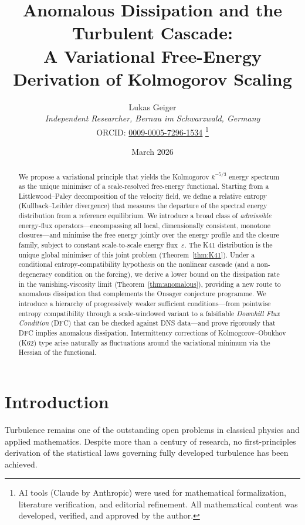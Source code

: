 \documentclass[12pt,a4paper]{article}
\title{Anomalous Dissipation and the Turbulent Cascade:\\
A Variational Free-Energy Derivation of Kolmogorov Scaling}
\author{Lukas Geiger\\
\textit{Independent Researcher, Bernau im Schwarzwald, Germany}\\
ORCID: \href{https://orcid.org/0009-0005-7296-1534}{0009-0005-7296-1534}%
\thanks{AI tools (Claude by Anthropic) were used for mathematical formalization, literature verification, and editorial refinement. All mathematical content was developed, verified, and approved by the author.}}
\date{March 2026}
\theoremstyle{definition}
\theoremstyle{plain}
\theoremstyle{remark}
\begin{document}
\maketitle

\begin{abstract}
We propose a variational principle that yields the Kolmogorov $k^{-5/3}$
energy spectrum as the unique minimiser of a scale-resolved free-energy
functional.  Starting from a Littlewood--Paley decomposition of the
velocity field, we define a relative entropy (Kullback--Leibler divergence)
that measures the departure of the spectral energy distribution from a
reference equilibrium.  We introduce a broad class of \emph{admissible}
energy-flux operators---encompassing all local, dimensionally consistent,
monotone closures---and minimise the free energy jointly over the energy
profile and the closure family, subject to constant scale-to-scale energy
flux~$\varepsilon$.  The K41 distribution is the unique global minimiser
of this joint problem (Theorem~\ref{thm:K41}).  Under a conditional entropy-compatibility hypothesis on the
nonlinear cascade (and a non-degeneracy condition on the forcing),
we derive a lower bound on the dissipation rate in the
vanishing-viscosity limit (Theorem~\ref{thm:anomalous}), providing
a new route to anomalous dissipation that complements the Onsager
conjecture programme.  We introduce a hierarchy of progressively
weaker sufficient conditions---from pointwise entropy compatibility
through a scale-windowed variant to a falsifiable \emph{Downhill Flux
Condition} (DFC) that can be checked against DNS data---and prove
rigorously that DFC implies anomalous dissipation.
Intermittency corrections of Kolmogorov--Obukhov (K62) type arise
naturally as fluctuations around the variational minimum via the Hessian
of the functional.
\end{abstract}

\section{Introduction}\label{sec:intro}

Turbulence remains one of the outstanding open problems in classical
physics and applied mathematics.  Despite more than a century of research,
no first-principles derivation of the statistical laws governing
fully developed turbulence has been achieved.
\end{document}
